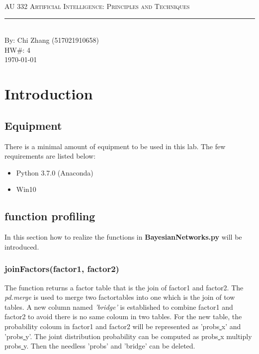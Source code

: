 \documentclass[aps,letterpaper,10pt]{revtex4}
\newcommand{\labtitle}{AU 332 Artificial Intelligence: Principles and Techniques}
\newcommand{\authorname}{Chi Zhang (517021910658)}
\newcommand{\hw}{4}
\begin{document}


\begin{titlepage}
\begin{center}
{\Large \textsc{\labtitle} \\ \vspace{4pt}}
\rule[13pt]{\textwidth}{1pt} \\ \vspace{150pt}
{\large By: \authorname \\ \vspace{10pt}
HW\#: \hw \\ \vspace{10pt}
\today}
\end{center}
\end{titlepage}



\section{Introduction}
\subsection{Equipment}
There is a minimal amount of equipment to be used in this lab.  The few requirements are listed below:
	\begin{itemize}
		\item Python 3.7.0 (Anaconda)
		\item Win10
	\end{itemize}

\subsection{function profiling}
In this section how to realize the functions in \textbf{BayesianNetworks.py} will be introduced.


\subsubsection{joinFactors(factor1, factor2)}
The function returns a factor table that is the join of factor1 and factor2. The \emph{pd.merge} is used to merge two factortables into one which is the join of tow tables. A new column named \emph{'bridge'} is established to combine factor1 and factor2 to avoid there is no same coloum in two tables. For the new table, the probability coloum in factor1 and factor2 will be represented as 'probs\underline{ }x' and 'probs\underline{ }y'. The joint distribution probability can be computed as probs\underline{ }x multiply probs\underline{ }y. Then the needless 'probs' and 'bridge' can be deleted.
 
\end{document}
